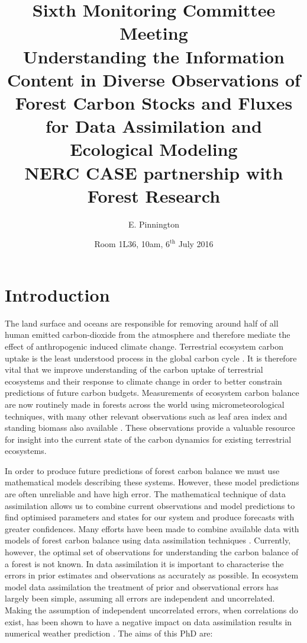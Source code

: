 \documentclass[11pt]{article}
\title{Sixth Monitoring Committee Meeting \\\vspace{4mm} \normalsize{Understanding the Information Content in Diverse Observations of Forest Carbon Stocks and Fluxes for Data Assimilation and Ecological Modeling\\ NERC CASE partnership with Forest Research}}
\author{\normalsize{E. Pinnington}}
\date{\normalsize{Room 1L36, 10am, $6^{\text{th}}$ July 2016}}
\begin{document}
\maketitle

\section{Introduction} \label{sec:intro}

The land surface and oceans are responsible for removing around half of all human emitted carbon-dioxide from the atmosphere and therefore mediate the effect of anthropogenic induced climate change. Terrestrial ecosystem carbon uptake is the least understood process in the global carbon cycle \citep{ciais2014carbon}. It is therefore vital that we improve understanding of the carbon uptake of terrestrial ecosystems and their response to climate change in order to better constrain predictions of future carbon budgets. Measurements of ecosystem carbon balance are now routinely made in forests across the world using micrometeorological techniques, with many other relevant observations such as leaf area index and standing biomass also available \citep{baldocchi2008turner}. These observations provide a valuable resource for insight into the current state of the carbon dynamics for existing terrestrial ecosystems. 

In order to produce future predictions of forest carbon balance we must use mathematical models describing these systems. However, these model predictions are often unreliable and have high error. The mathematical technique of data assimilation allows us to combine current observations and model predictions to find optimised parameters and states for our system and produce forecasts with greater confidences. Many efforts have been made to combine available data with models of forest carbon balance using data assimilation techniques \citep{zobitz2011primer, fox2009reflex, richardson2010estimating, Quaife2008, Zobitz2014, Niu2014}. Currently, however, the optimal set of observations for understanding the carbon balance of a forest is not known. In data assimilation it is important to characterise the errors in prior estimates and observations as accurately as possible. In ecosystem model data assimilation the treatment of prior and observational errors has largely been simple, assuming all errors are independent and uncorrelated. Making the assumption of independent uncorrelated errors, when correlations do exist, has been shown to have a negative impact on data assimilation results in numerical weather prediction \citep{smith2009variational, weston2014accounting}. The aims of this PhD are:
\end{document}
